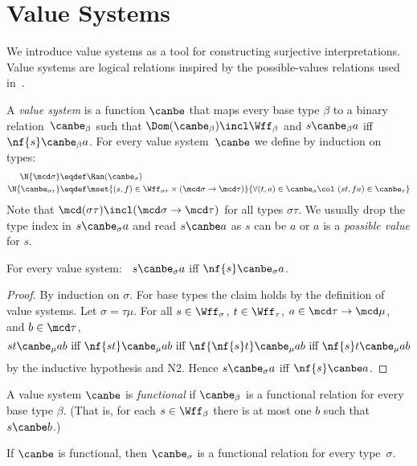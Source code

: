\section{Value Systems}
\label{sec:value-sys}

We introduce value systems as a tool for constructing
surjective interpretations.  Value systems are
logical relations inspired by the possible-values
relations used
in~\cite{BrownARHO,BrownSmolkaEFO,BrownSmolkaBasic}.

A \emph{value system} is a function $\canbe$ that maps
every base type $\beta$ to a binary
relation~$\canbe_\beta$ such that
$\Dom(\canbe_\beta)\incl\Wff_\beta$ and $s\canbe_\beta
a$ iff $\nf{s}\canbe_\beta a$.  For every value
system~$\canbe$ we define by induction on types:
\begin{align*}
  \N{\mcd\sigma}&\eqdef\Ran(\canbe_\sigma)\\
  \N{\canbe_{\sigma\tau}}&\eqdef\mset{(s,f)\in\Wff_{\sigma\tau}\times(\mcd\sigma\to\mcd\tau)}
  {\forall(t,a)\in\canbe_\sigma\col~(st,fa)\in\canbe_\tau}
\end{align*}
Note that
$\mcd(\sigma\tau)\incl(\mcd\sigma\to\mcd\tau)$ for all
types $\sigma\tau$.  We usually drop the type index in
$s\canbe_\sigma a$ and read $s\canbe a$ as $s$ can be
$a$ or $a$ is a \emph{possible value} for $s$.

\begin{prop}
  \label{prop-norm-poss-value}
  For every value system: \
  $s\canbe_\sigma a$ iff $\nf{s}\canbe_\sigma a$.
\end{prop}

\begin{proof}
  By induction on $\sigma$.  For base types the claim
  holds by the definition of value systems.  Let
  $\sigma=\tau\mu$.
  For all $s\in\Wff_\sigma$, $t\in\Wff_\tau$, $a\in\mcd\tau\to\mcd\mu$, and $b\in\mcd\tau$,
  $$st\canbe_\mu ab
  {\mbox{ iff }}
  \nf{st}\canbe_\mu ab
  {\mbox{ iff }}
  \nf{\nf{s}t}\canbe_\mu ab
  {\mbox{ iff }}
  \nf{s}t\canbe_\mu ab$$
  by the inductive hypothesis and N2.
  Hence $s\canbe_\sigma a$ iff $\nf{s}\canbe a$.
\end{proof}

A value system $\canbe$ is \emph{functional} if
$\canbe_\beta$ is a functional relation for every base
type $\beta$.
(That is, for each $s\in\Wff_\beta$ there is at most one $b$ such that $s\canbe b$.) 

\begin{prop}
  \label{prop-functional-vs}
  If $\canbe$ is functional, then $\canbe_\sigma$ is a
  functional relation for every type~$\sigma$.
\end{prop}

